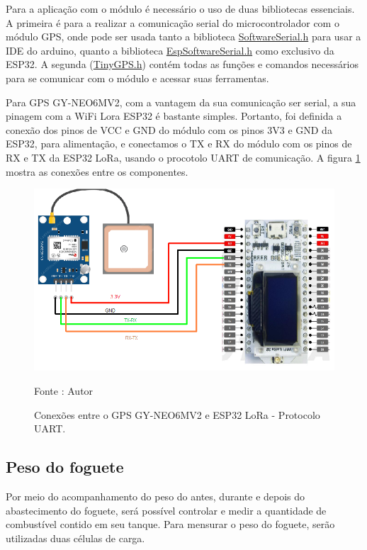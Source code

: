 \par Para a aplicação com o módulo é necessário o uso de duas bibliotecas essenciais. A primeira é para a realizar a comunicação serial do microcontrolador com o módulo GPS, onde pode ser usada tanto a biblioteca \href{https://www.arduino.cc/en/Reference/softwareSerial}{SoftwareSerial.h} para usar a IDE do arduino, quanto a biblioteca \href{https://github.com/plerup/espsoftwareserial}{EspSoftwareSerial.h} como exclusivo da ESP32. A segunda (\href{https://github.com/mikalhart/TinyGPS}{TinyGPS.h}) contém todas as funções e comandos necessários para se comunicar com o módulo e acessar suas ferramentas.

\par Para GPS GY-NEO6MV2, com a vantagem da sua comunicação ser serial, a sua pinagem com a WiFi Lora ESP32 é bastante simples. Portanto, foi definida a conexão dos pinos de VCC e GND do módulo com os pinos 3V3 e GND da ESP32, para alimentação, e conectamos o TX e RX do módulo com os pinos de RX e TX da ESP32 LoRa, usando o procotolo UART de comunicação. A figura \ref{fig:PINAGEM_GPS} mostra as conexões entre os componentes.

\begin{figure}[H]
  \centering
  \includegraphics[scale=0.4]{figuras/PINAGEM_GPS.png}
  \caption{Conexões entre o GPS GY-NEO6MV2 e ESP32 LoRa - Protocolo UART.} 
  {\footnotesize Fonte : Autor } 
  \label{fig:PINAGEM_GPS}
\end{figure}


\subsection{Peso do foguete}
\label{Peso_do_Foguete}

\par Por meio do acompanhamento do peso do antes, durante e depois do abastecimento do foguete, será possível controlar e medir a quantidade de combustível contido em seu tanque. Para mensurar o peso do foguete, serão utilizadas duas células de carga. 

